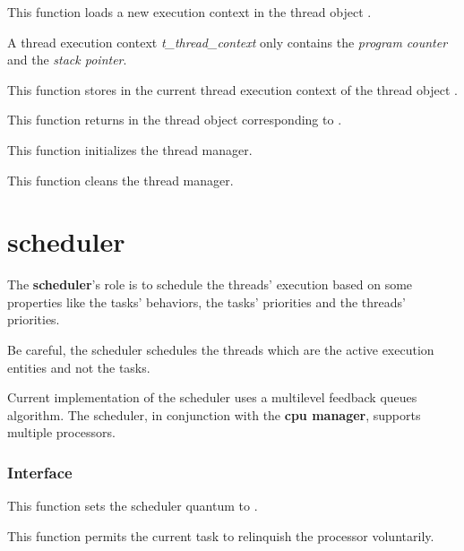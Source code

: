 	 {
	   This function loads a new execution context in the thread
	   object .

	   A thread execution context \textit{t\_thread\_context}
	   only contains the \textit{program counter} and the
	   \textit{stack pointer}.
	 }

	 {
	   This function stores in  the current
	   thread execution context of the thread object .
	 }

	 {
	   This function returns in  the thread object
	   corresponding to .
	 }

	 {
	   This function initializes the thread manager.
	 }

	 {
	   This function cleans the thread manager.
	 }

%
%

\section{scheduler}

The \textbf{scheduler}'s role is to schedule the threads' execution
based on some properties like the tasks' behaviors, the tasks' priorities
and the threads' priorities.

Be careful, the scheduler schedules the threads which are the active
execution entities and not the tasks.

Current implementation of the scheduler uses a multilevel feedback
queues algorithm. The scheduler, in conjunction with the \textbf{cpu
manager}, supports multiple processors.

%
%

\subsubsection{Interface}

	 {
	   This function sets the scheduler quantum to .
	 }

	 {
	   This function permits the current task to relinquish
	   the processor  voluntarily.
	 }

